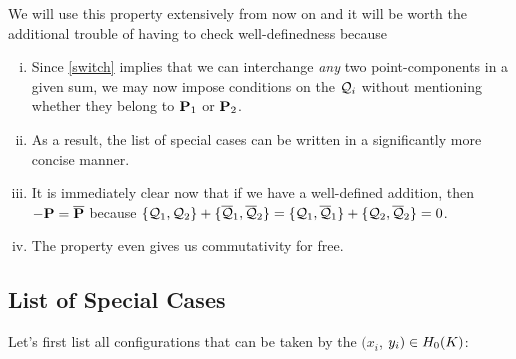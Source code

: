 \vspace{2mm}
\begin{remark}
We will use this property extensively from now on and it will be worth the additional trouble of having to check well-definedness because
\begin{enumerate}[(i)]\parskip 0mm
	\item Since \eqref{switch} implies that we can interchange \textit{any} two point-components in a given sum, we may now impose conditions on the $\q_i$ without mentioning whether they belong to $\P_1$ or $\P_2$.
	\item As a result, the list of special cases can be written in a significantly more concise manner.
	\item It is immediately clear now that if we have a well-defined addition, then $-\P = \bar \P$ because $\{ \q_1 , \q_2 \} + \{ \bar \q_1 , \bar \q_2 \} = \{ \q_1 , \bar \q_1 \} + \{ \q_2 , \bar \q_2 \}=0$.
	\item The property even gives us commutativity for free.
\end{enumerate}
\parskip 3mm
\end{remark}


\newpage
\subsection{List of Special Cases}

Let's first list all configurations that can be taken by the $(x_i$, $y_i) \in \enk$:

